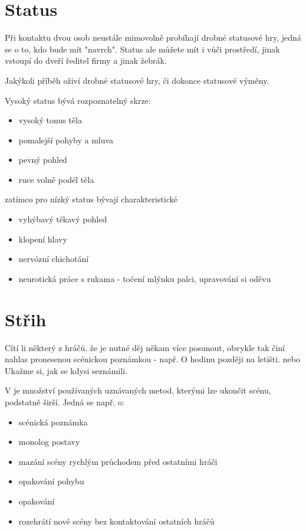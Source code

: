  
\needspace{5cm} \section{Status} \label{status} Při kontaktu dvou osob neustále mimovolně probíhají drobné statusové hry, 
jedná se o to, kdo bude mít "navrch". Status ale můžete mít i vůči prostředí, jinak vstoupí do  
dveří ředitel firmy a jinak žebrák. 
 
Jakýkoli příběh oživí drobné statusové hry, či dokonce statusové výměny. 
 
 
Vysoký status bývá rozpoznatelný skrze: 
\begin{itemize}
\item vysoký tonus těla
\item pomalejší pohyby a mluva
\item pevný pohled
\item ruce volně podél těla
\end{itemize}
zatímco pro  nízký status bývají charakteristické 
\begin{itemize}
\item vyhýbavý těkavý pohled
\item klopení hlavy
\item nervózní chichotání
\item neurotická práce s rukama - točení mlýnku palci, upravování si oděvu
\end{itemize}
 
\needspace{5cm} \section{Střih} \label{střih} Cítí li některý z hráčů, že je nutné děj někam více posunout, obvykle tak činí nahlas pronesenou scénickou poznámkou  - např. O hodinu později na letišti.  nebo Ukažme si, jak se kdysi seznámili. 
 
V  je množství používaných uznávaných metod, kterými  lze ukončit scénu, podstatně širší. 
Jedná se např. o: 
 
\begin{itemize}
\item scénická poznámka
\item monolog postavy
\item mazání scény rychlým průchodem před ostatními hráči
\item opakování pohybu
\item opakování 
\item rozehrátí nové scény bez kontaktování ostatních hráčů
\end{itemize}
 
